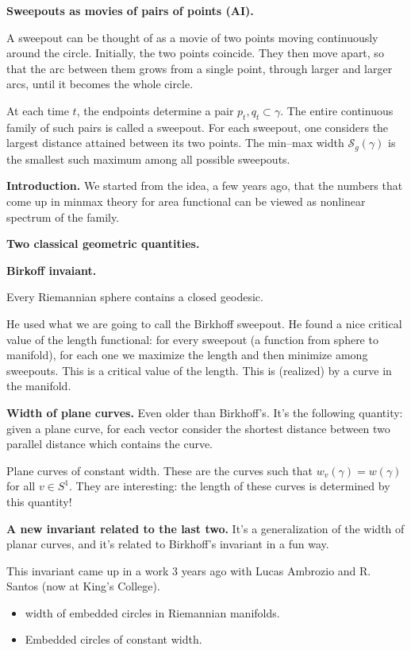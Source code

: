 \medskip\noindent
{\bf Sweepouts as movies of pairs of points
(AI).}

A sweepout can be thought of as a movie of
two points moving continuously around the
circle. Initially, the two points coincide.
They then move apart, so that the arc between
them grows from a single point, through
larger and larger arcs, until it becomes the
whole circle.

At each time $t$, the endpoints determine a
pair ${p_t,q_t}\subset\gamma$. The entire
continuous family of such pairs is called a
sweepout. For each sweepout, one considers
the largest distance attained between its
two points. The min--max width
$\mathcal{S}_g(\gamma)$ is the smallest such
maximum among all possible sweepouts.


\medskip\noindent
{\bf Introduction.} We started from the
idea, a few years ago, that the numbers that
come up in minmax theory for area functional
can be viewed as nonlinear spectrum of the
family.

\medskip\noindent
{\bf Two classical geometric quantities.}

\medskip\noindent
{\bf Birkoff invaiant.}

\begin{theorem}[Birkhof, 1917]
\label{theorem-birkof17}
Every Riemannian sphere contains a closed
geodesic.
\end{theorem}

\noindent
He used what we are going to call
the Birkhoff sweepout.
He found a nice critical value of the
length functional: for every sweepout (a
function from sphere to manifold), for each
one we  maximize the length and then
minimize among sweepouts. This is a critical
value of the length.
This is (realized) by a curve in the
manifold.

\medskip\noindent
{\bf Width of plane curves.}
Even older than Birkhoff's. It's the
following quantity: given a plane curve, for
each vector consider the shortest distance
between two parallel distance which contains
the curve.

\noindent
Plane curves of constant width. These are
the curves such that $w_v(\gamma) =
w(\gamma)$ for all $v \in S^1$. They are
interesting: the length of these curves is
determined by this quantity!

\medskip\noindent
{\bf A new invariant related to the last
two.}
It's a generalization of the width of planar
curves, and it's related to Birkhoff's
invariant in a fun way.

This invariant came up in a work 3 years ago
with Lucas Ambrozio and R. Santos (now at
King's College).
\begin{itemize}
\item width of embedded circles in
Riemannian manifolds.
\item Embedded circles of constant width.
\end{itemize}

